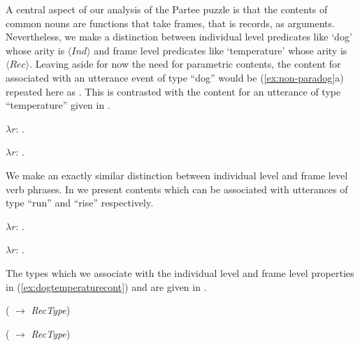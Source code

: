 A central aspect of our analysis of the Partee puzzle is that the
contents of common nouns are functions that take frames, that is
records, as arguments.  Nevertheless, we make a distinction between
individual level predicates like `dog' whose arity is
$\langle\textit{Ind}\rangle$ and frame level predicates like
`temperature' whose arity is $\langle\textit{Rec}\rangle$.  Leaving
aside for now the need for parametric contents, the content for
associated with an utterance event of type ``dog'' would be
(\ref{ex:non-paradog}a) repeated here as .  This is contrasted with
the content for an utterance of type ``temperature'' given in
.
\begin{ex} 
\begin{subex} 
 
\item $\lambda
  r$: .   
 
\item $\lambda
  r$: .  
 
\end{subex} 
\label{ex:dogtemperaturecont}   
\end{ex} 
We make an exactly similar distinction between individual level and
frame level verb phrases.  In \nexteg{} we present contents which can
be associated with utterances of type ``run'' and ``rise''
respectively.
\begin{ex} 
\begin{subex} 
 
\item $\lambda
  r$:
  .  
 
\item $\lambda
  r$: .  
 
\end{subex} 
   
\end{ex} 
The types which we associate with the individual level and frame level properties in
(\ref{ex:dogtemperaturecont}) and \preveg{} are given in \nexteg{}.
\begin{ex} 
\begin{subex} 
 
\item ( $\rightarrow$ \textit{RecType})
 
\item ( $\rightarrow$ \textit{RecType}) 
 
\end{subex} 
\label{ex:pptytypes}   
\end{ex} 
